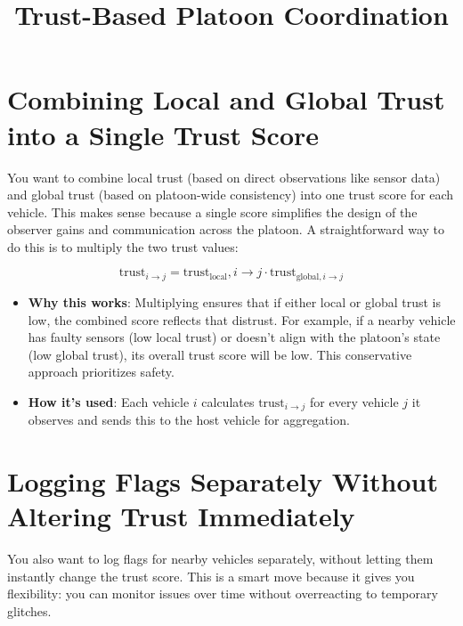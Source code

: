 \documentclass{article}
\title{Trust-Based Platoon Coordination}
\author{}
\date{}
\begin{document}
\maketitle

\section{Combining Local and Global Trust into a Single Trust Score}

You want to combine local trust (based on direct observations like sensor data) and global trust (based on platoon-wide consistency) into one trust score for each vehicle. This makes sense because a single score simplifies the design of the observer gains and communication across the platoon. A straightforward way to do this is to multiply the two trust values:

\[
\text{trust}_{i \to j} = \text{trust}_{\text{local}}, i \to j \cdot \text{trust}_{\text{global}, i \to j}
\]

\begin{itemize}
    \item \textbf{Why this works}: Multiplying ensures that if either local or global trust is low, the combined score reflects that distrust. For example, if a nearby vehicle has faulty sensors (low local trust) or doesn't align with the platoon's state (low global trust), its overall trust score will be low. This conservative approach prioritizes safety.
    
    \item \textbf{How it's used}: Each vehicle \( i \) calculates \( \text{trust}_{i \to j} \) for every vehicle \( j \) it observes and sends this to the host vehicle for aggregation.
\end{itemize}

\section{Logging Flags Separately Without Altering Trust Immediately}

You also want to log flags for nearby vehicles separately, without letting them instantly change the trust score. This is a smart move because it gives you flexibility: you can monitor issues over time without overreacting to temporary glitches.
\end{document}
